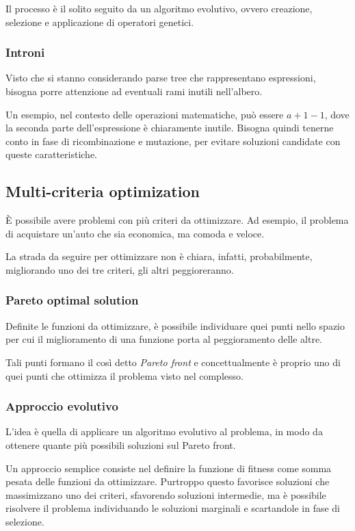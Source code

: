 \documentclass[a4paper]{article}
\begin{document}
Il processo è il solito seguito da un algoritmo evolutivo, 
ovvero creazione, selezione e applicazione di operatori genetici.

\subsubsection{Introni}
Visto che si stanno considerando parse tree che rappresentano espressioni, 
bisogna porre attenzione ad eventuali rami inutili nell'albero.

Un esempio, nel contesto delle operazioni matematiche, può essere 
$a + 1 - 1$, dove la seconda parte dell'espressione è chiaramente inutile.
Bisogna quindi tenerne conto in fase di ricombinazione e mutazione, per evitare 
soluzioni candidate con queste caratteristiche.

\subsection{Multi-criteria optimization}
È possibile avere problemi con più criteri da ottimizzare.
Ad esempio, il problema di acquistare un'auto che sia economica, 
ma comoda e veloce.

La strada da seguire per ottimizzare non è chiara, infatti, probabilmente, 
migliorando uno dei tre criteri, gli altri peggioreranno.

\subsubsection{Pareto optimal solution}
Definite le funzioni da ottimizzare, è possibile individuare quei punti nello 
spazio per cui il miglioramento di una funzione porta al peggioramento delle altre.

Tali punti formano il così detto \emph{Pareto front} e concettualmente
è proprio uno di quei punti che ottimizza il problema visto nel complesso.

\subsubsection{Approccio evolutivo}
L'idea è quella di applicare un algoritmo evolutivo al problema, 
in modo da ottenere quante più possibili soluzioni sul Pareto front.

Un approccio semplice consiste nel definire la funzione di fitness come 
somma pesata delle funzioni da ottimizzare. Purtroppo questo favorisce
soluzioni che massimizzano uno dei criteri, sfavorendo soluzioni intermedie, 
ma è possibile risolvere il problema individuando le soluzioni marginali e scartandole
in fase di selezione.
\end{document}
